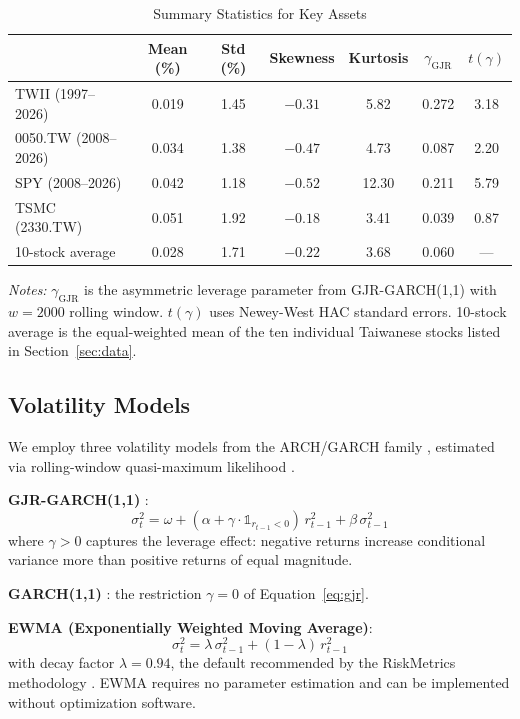 \begin{table}[H]
\centering
\caption{Summary Statistics for Key Assets}
\label{tab:summary_stats}
\begin{tabular}{lcccccc}
\toprule
& Mean (\%) & Std (\%) & Skewness & Kurtosis & $\gamma_{\text{GJR}}$ & $t(\gamma)$ \\
\midrule
TWII (1997--2026) & 0.019 & 1.45 & $-0.31$ & 5.82 & 0.272 & 3.18 \\
0050.TW (2008--2026) & 0.034 & 1.38 & $-0.47$ & 4.73 & 0.087 & 2.20 \\
SPY (2008--2026) & 0.042 & 1.18 & $-0.52$ & 12.30 & 0.211 & 5.79 \\
TSMC (2330.TW) & 0.051 & 1.92 & $-0.18$ & 3.41 & 0.039 & 0.87 \\
10-stock average & 0.028 & 1.71 & $-0.22$ & 3.68 & 0.060 & --- \\
\bottomrule
\end{tabular}
\begin{flushleft}
\small \textit{Notes:} $\gamma_{\text{GJR}}$ is the asymmetric leverage parameter from GJR-GARCH(1,1) with $w = 2000$ rolling window. $t(\gamma)$ uses Newey-West HAC standard errors. 10-stock average is the equal-weighted mean of the ten individual Taiwanese stocks listed in Section~\ref{sec:data}.
\end{flushleft}
\end{table}

\subsection{Volatility Models}

We employ three volatility models from the ARCH/GARCH family \citep{engle1982,bollerslev1986}, estimated via rolling-window quasi-maximum likelihood \citep{bollerslev1992}.

\textbf{GJR-GARCH(1,1)} \citep{glosten1993}:
\begin{equation}
\sigma_t^2 = \omega + (\alpha + \gamma \cdot \mathbb{1}_{r_{t-1}<0}) \, r_{t-1}^2 + \beta \, \sigma_{t-1}^2
\label{eq:gjr}
\end{equation}
where $\gamma > 0$ captures the leverage effect: negative returns increase conditional variance more than positive returns of equal magnitude.

\textbf{GARCH(1,1)} \citep{bollerslev1986}: the restriction $\gamma = 0$ of Equation~\eqref{eq:gjr}.

\textbf{EWMA (Exponentially Weighted Moving Average)}:
\begin{equation}
\sigma_t^2 = \lambda \, \sigma_{t-1}^2 + (1 - \lambda) \, r_{t-1}^2
\label{eq:ewma}
\end{equation}
with decay factor $\lambda = 0.94$, the default recommended by the RiskMetrics methodology \citep{jpmorgan1996}. EWMA requires no parameter estimation and can be implemented without optimization software.

